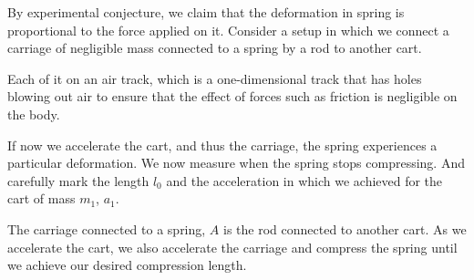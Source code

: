 By experimental conjecture, we claim that the deformation in spring is proportional to the force applied on it.
Consider a setup in which we connect a carriage of negligible mass connected to a spring by a rod to another 
cart. 

Each of it on an air track, which is a one-dimensional track that has holes blowing
out air to ensure that the effect of forces such as friction is negligible on the body.

If now we accelerate the cart, and thus the carriage, the spring experiences a particular deformation. We now measure 
when the spring stops compressing. And carefully mark the length \(l_0\) and the
acceleration in which we achieved for the cart of mass \(m_1\), \(a_1\). 

\begin{marginfigure}
    \centering
    \caption{The carriage connected to a spring, \(A\) is the rod connected to another 
    cart. As we accelerate the cart, we also accelerate the carriage 
    and compress the spring until we achieve our desired compression length.}
\end{marginfigure}

